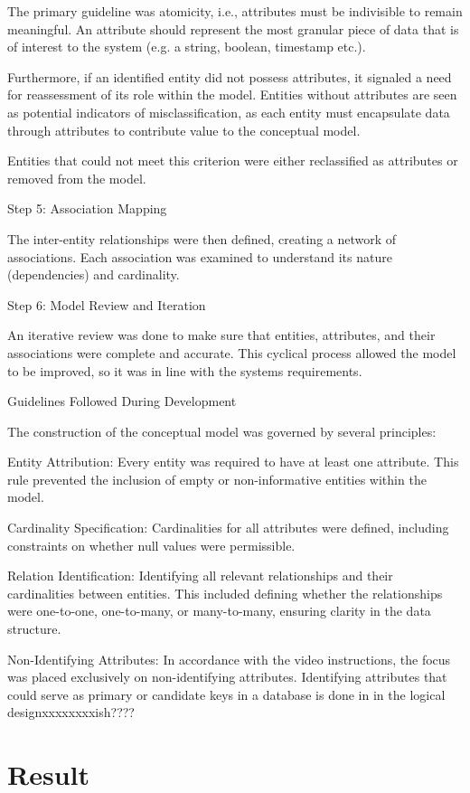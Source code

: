 \documentclass[a4paper]{scrartcl}
\begin{document}
The primary guideline was atomicity, i.e., attributes must be indivisible to remain meaningful. An attribute should represent the most granular piece of data that is of interest to the system (e.g. a string, boolean, timestamp etc.). 

Furthermore, if an identified entity did not possess attributes, it signaled a need for reassessment of its role within the model. Entities without attributes are seen as potential indicators of misclassification, as each entity must encapsulate data through attributes to contribute value to the conceptual model.

Entities that could not meet this criterion were either reclassified as attributes or removed from the model. 

Step 5: Association Mapping 

The inter-entity relationships were then defined, creating a network of associations. Each association was examined to understand its nature (dependencies) and cardinality.

Step 6: Model Review and Iteration 

An iterative review was done to make sure that entities, attributes, and their associations were complete and accurate. This cyclical process allowed the model to be improved, so it was in line with the systems requirements.

Guidelines Followed During Development 

The construction of the conceptual model was governed by several principles:

Entity Attribution: Every entity was required to have at least one attribute. This rule prevented the inclusion of empty or non-informative entities within the model.

Cardinality Specification: Cardinalities for all attributes were defined, including constraints on whether null values were permissible. 

Relation Identification: Identifying all relevant relationships and their cardinalities between entities. This included defining whether the relationships were one-to-one, one-to-many, or many-to-many, ensuring clarity in the data structure.

Non-Identifying Attributes: In accordance with the video instructions, the focus was placed exclusively on non-identifying attributes. Identifying attributes that could serve as primary or candidate keys in a database is done in in the logical designxxxxxxxxish????
\section{Result}
\end{document}
